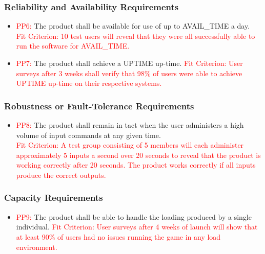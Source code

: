 \documentclass[12pt, titlepage]{article}
\begin{document}
\subsubsection{Reliability and Availability Requirements}
\begin{itemize}
\item \textcolor{red}{PP6: }The product shall be available for use of up to AVAIL\_TIME a day.\\
\textcolor{red}{Fit Criterion: 10 test users will reveal that they were all successfully able to run the software for AVAIL\_TIME.}
\item \textcolor{red}{PP7: }The product shall achieve a UPTIME up-time.
\textcolor{red}{Fit Criterion: User surveys after 3 weeks shall verify that 98\% of users were able to achieve UPTIME up-time on their respective systems.}
\end{itemize}

\subsubsection{Robustness or Fault-Tolerance Requirements}
\begin{itemize}
\item \textcolor{red}{PP8: } The product shall remain in tact when the user administers a high volume of input commands at any given time.\\
\textcolor{red}{Fit Criterion: A test group consisting of 5 members will each administer approximately 5 inputs a second over 20 seconds to reveal that the product is working correctly after 20 seconds. The product works correctly if all inputs produce the correct outputs.}
\end{itemize}

\subsubsection{Capacity Requirements}
\begin{itemize}
\item \textcolor{red}{PP9: }The product shall be able to handle the loading produced by a single individual.
\textcolor{red}{Fit Criterion: User surveys after 4 weeks of launch will show that at least 90\% of users had no issues running the game in any load environment.}
\end{itemize}
\end{document}
